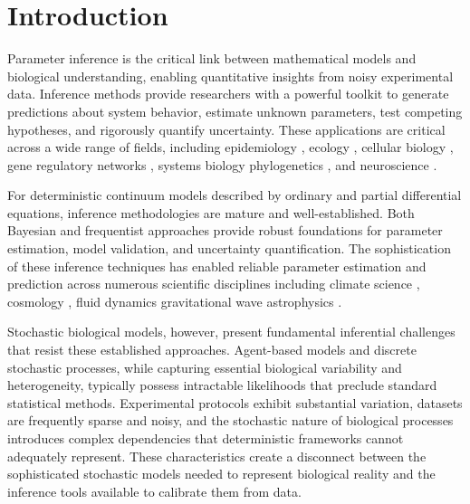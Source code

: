 \documentclass{article}
\begin{document}



\section{Introduction}
Parameter inference is the critical link between mathematical models and biological understanding, enabling quantitative insights from noisy experimental data. Inference methods provide researchers with a powerful toolkit to generate predictions about system behavior, estimate unknown parameters, test competing hypotheses, and rigorously quantify uncertainty. These applications are critical across a wide range of fields, including epidemiology \citep{Dunson2005,Semochkina2025}, ecology \citep{Qian2009,Rosen2001}, cellular biology \citep{Vallejos2015}, gene regulatory networks \citep{Liu2016,Wang2019}, systems biology \citep{Rabinowitz2013} phylogenetics \citep{Nascimento2017}, and neuroscience \citep{Coventry2024}.

For deterministic continuum models described by ordinary and partial differential equations, inference methodologies are mature and well-established. Both Bayesian \citep{Bernardo1994,Gelman1995} and frequentist \citep{Cox1974,Casella1990} approaches provide robust foundations for parameter estimation, model validation, and uncertainty quantification. The sophistication of these inference techniques has enabled reliable parameter estimation and prediction across numerous scientific disciplines including climate science \citep{Vrugt2014}, cosmology \citep{Planck2018Params}, fluid dynamics \citep{Cheung2011} gravitational wave astrophysics \citep{Veitch2015}. 

Stochastic biological models, however, present fundamental inferential challenges that resist these established approaches. Agent-based models and discrete stochastic processes, while capturing essential biological variability and heterogeneity, typically possess intractable likelihoods that preclude standard statistical methods. Experimental protocols exhibit substantial variation, datasets are frequently sparse and noisy, and the stochastic nature of biological processes introduces complex dependencies that deterministic frameworks cannot adequately represent. These characteristics create a disconnect between the sophisticated stochastic models needed to represent biological reality and the inference tools available to calibrate them from data.
\end{document}
